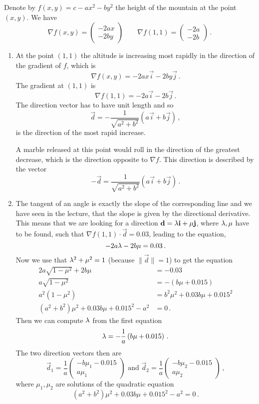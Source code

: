 \begin{solution}
Denote by $f(x,y) = c - ax^2 - by^2$ the height of the mountain at the point $(x,y)$. 
We have
\[
\nabla f(x,y) = \begin{pmatrix} -2ax \\ -2by \end{pmatrix}
\qquad
\nabla f\left( 1,1 \right) = \begin{pmatrix} -2a \\ -2b \end{pmatrix}\,.
\]

\begin{enumerate}
\item
At the point $(1,1)$ the altitude is increasing most rapidly in the direction of the gradient of $f$, which is
\[
\nabla f(x,y) = -2ax \vec i - 2by \vec j\,.
\]
The gradient at $(1,1)$ is
\[
\nabla f\left( 1,1 \right) = -2a\vec i - 2b \vec j\,.
\]
The direction vector has to have unit length and so
\[
\vec d = -\frac{1}{\sqrt{a^2+b^2}} \left( a \vec i + b \vec j \right)\,,
\]
is the direction of the most rapid increase.

A marble released at this point would roll in the direction of the greatest decrease, which is the direction opposite to $\nabla f$. This direction is described by the vector
\[
-\vec d = \frac{1}{\sqrt{a^2+b^2}} \left( a \vec i + b \vec j \right)\,.
\]

\item
The tangent of an angle is exactly the slope of the corresponding line and we have seen in the lecture, that the slope is given by the directional derivative. This means that we are looking for a direction $\bm{\mathrm{d}} = \lambda \bm{\mathrm{i}} + \mu \bm{\mathrm{j}}$, where $\lambda, \mu$ have to be found, such that $\nabla f(1,1) \cdot \vec d = 0.03$, leading to the equation,
\[
-2a\lambda -2b\mu = 0.03\,.
\]
Now we use that $\lambda^2 + \mu^2 = 1$ (because $\| \vec d \|=1$) to get the equation
\begin{align*}
2a\sqrt{1-\mu^2} + 2b\mu &= -0.03 \\
a\sqrt{1-\mu^2} &= -(b\mu + 0.015) \\
a^2\left(1-\mu^2\right) &= b^2\mu^2 + 0.03b\mu + 0.015^2 \\
\left(a^2+ b^2\right)\mu^2 + 0.03b\mu + 0.015^2 - a^2 &= 0\,.
\end{align*}
Then we can compute $\lambda$ from the first equation
\[
\lambda = -\frac{1}{a}\left( b\mu + 0.015\right)\,.
\]
The two direction vectors then are
\[
\vec d_1 = \frac{1}{a} \begin{pmatrix} -b\mu_1 - 0.015 \\ a\mu_1 \end{pmatrix}
\text{ and }
\vec d_2 = \frac{1}{a} \begin{pmatrix} -b\mu_2 - 0.015 \\ a\mu_2 \end{pmatrix}\,,
\]
where $\mu_1,\mu_2$ are solutions of the quadratic equation
\[
\left(a^2+ b^2\right)\mu^2 + 0.03b\mu + 0.015^2 - a^2 = 0\,.
\]
\end{enumerate}
\end{solution}

